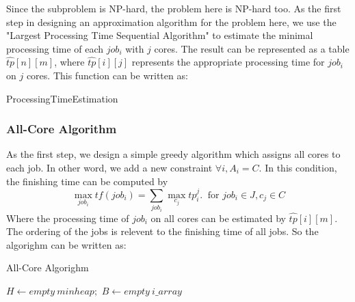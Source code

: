 \documentclass{llncs}
\begin{document}
  Since the subproblem is NP-hard, the problem here is NP-hard too. As the first step in designing an approximation algorithm for the problem here, we use the "Largest Processing Time Sequential Algorithm" to estimate the minimal processing time of each $job_i$ with $j$ cores. The result can be represented as a table $\hat{tp}[n][m]$, where $\hat{tp}[i][j]$ represents the appropriate processing time for $job_i$ on $j$ cores. This function can be written as:\\
  \begin{minipage}[t]{0.9\textwidth}
    \begin{algorithm}[H]
      \BlankLine
      \caption{ProcessingTimeEstimation}\label{Alg_1}
      \BlankLine
    \end{algorithm}
  \end{minipage}
\subsubsection{All-Core Algorithm}
  As the first step, we design a simple greedy algorithm which assigns all cores to each job. In other word, we add a new constraint $ \forall i, A_i = C$.  In this condition, the finishing time can be computed by
  $$\max_{job_i} tf(job_i) = \sum_{job_i} \max_{c_j}{tp_i^j}.  \ \text{ for } job_i \in J, c_j \in C $$
  Where the processing time of $job_i$ on all cores can be estimated by $\hat{tp}[i][m]$. The ordering of the jobs is relevent to the finishing time of all jobs. So the algorighm can be written as:\\
            \begin{minipage}[t]{0.9\textwidth}
            \begin{algorithm}[H]
              \BlankLine
              \caption{All-Core Algorighm}\label{Alg_1}
              \BlankLine
              $H \leftarrow empty \ minheap;$ $B \leftarrow empty\  i\_array$\;
             \end{algorithm}
             \end{minipage}
\end{document}
